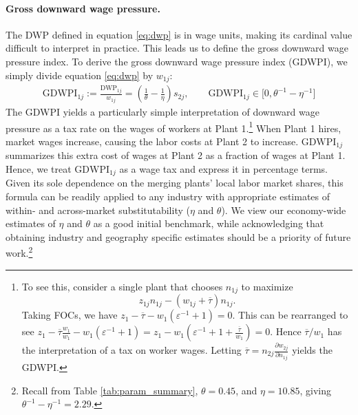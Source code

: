 \documentclass[12pt]{article}
\theoremstyle{prop}
\begin{document}
\paragraph{Gross downward wage pressure.}  
The DWP defined in equation \eqref{eq:dwp} is in wage units, making its cardinal value difficult to interpret in practice. 
This leads  us to  define the gross downward wage pressure index. 
To derive the gross downward wage pressure index (GDWPI), we simply divide equation \eqref{eq:dwp} by $w_{1j}$:
\begin{align}\label{eq:gdwp}
	\text{GDWPI}_{1j}:=	\frac{\text{DWP}_{1j}}{w_{1j}} = \left(\frac{1}{\theta}-\frac{1}{\eta}\right)s_{2j}, \qquad \text{GDWPI}_{1j}\in \Big[0, \theta^{-1}-\eta^{-1}\Big]
\end{align}%
The GDWPI yields a particularly simple interpretation of downward wage pressure as a tax rate on the wages of workers at Plant 1.\footnote{
    To see this, consider a single plant that chooses $n_{1j}$ to maximize 
	$$z_{1j} n_{1j} - (w_{1j}+\overline{\tau})n_{1j}.$$
	Taking FOCs, we have $z_1-\overline{\tau}-w_1(\varepsilon^{-1}+1)=0$. 
    This can be rearranged to see $z_1-\overline{\tau}\frac{w_1}{w_1}-w_1(\varepsilon^{-1}+1)=z_1-w_1(\varepsilon^{-1}+1+\frac{\overline{\tau}}{w_1})=0$.
    Hence $\overline{\tau}/w_1$ has the interpretation of a tax on worker wages. Letting   $\overline{\tau}=n_{2j} \frac{\partial w_{2j}}{\partial n_{1j}}$ yields the GDWPI.}  
When Plant 1 hires, market wages increase, causing the labor costs at Plant 2 to increase. 
$\text{GDWPI}_{1j}$ summarizes this extra cost of wages at Plant 2  as a fraction of wages at Plant 1. 
Hence, we treat $\text{GDWPI}_{1j}$ as a wage tax and express it in percentage terms.
Given its sole dependence on the merging plants' local labor market shares, this formula can be readily applied to any industry with appropriate estimates of within- and across-market substitutability ($\eta$ and $\theta$). 
We view our economy-wide estimates of $\eta$ and $\theta$ as a good initial benchmark, while acknowledging that obtaining industry and geography specific estimates should be a priority of future work.\footnote{
    Recall from Table \ref{tab:param_summary}, $\theta=0.45$, and $\eta=10.85$, giving $\theta^{-1}-\eta^{-1}=2.29$.}
\end{document}

